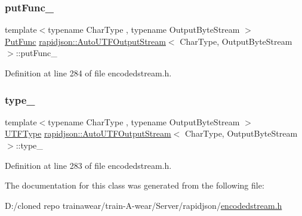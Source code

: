 \subsubsection{\texorpdfstring{putFunc\_}{putFunc\_}}
{\footnotesize\ttfamily template$<$typename Char\+Type , typename Output\+Byte\+Stream $>$ \\
\mbox{\hyperlink{classrapidjson_1_1_auto_u_t_f_output_stream_a2572eb3b4d77c0a2466ba21635ff79b5}{Put\+Func}} \mbox{\hyperlink{classrapidjson_1_1_auto_u_t_f_output_stream}{rapidjson\+::\+Auto\+U\+T\+F\+Output\+Stream}}$<$ Char\+Type, Output\+Byte\+Stream $>$\+::put\+Func\+\_\+\hspace{0.3cm}{\ttfamily [private]}}



Definition at line 284 of file encodedstream.\+h.

\mbox{\label{classrapidjson_1_1_auto_u_t_f_output_stream_afd7503e0eb83f1d5f90292d2d2779ead}} 
\subsubsection{\texorpdfstring{type\_}{type\_}}
{\footnotesize\ttfamily template$<$typename Char\+Type , typename Output\+Byte\+Stream $>$ \\
\mbox{\hyperlink{namespacerapidjson_a4aacabc0f8cea1cd628f466d890773eb}{U\+T\+F\+Type}} \mbox{\hyperlink{classrapidjson_1_1_auto_u_t_f_output_stream}{rapidjson\+::\+Auto\+U\+T\+F\+Output\+Stream}}$<$ Char\+Type, Output\+Byte\+Stream $>$\+::type\+\_\+\hspace{0.3cm}{\ttfamily [private]}}



Definition at line 283 of file encodedstream.\+h.



The documentation for this class was generated from the following file\+:\begin{DoxyCompactItemize}
\item 
D\+:/cloned repo trainawear/train-\/\+A-\/wear/\+Server/rapidjson/\mbox{\hyperlink{encodedstream_8h}{encodedstream.\+h}}\end{DoxyCompactItemize}
